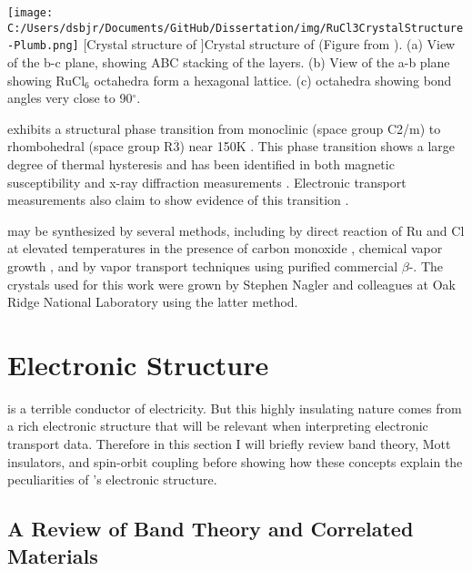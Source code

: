\begin{centering}
\texttt{[image: C:/Users/dsbjr/Documents/GitHub/Dissertation/img/RuCl3CrystalStructure-Plumb.png]}
  \captionsetup{width=0.75\textwidth}
  [Crystal structure of \ruclnospace]{Crystal structure of \rucl (Figure from \cite{Plumb2014}). (a) View of the b-c plane, showing ABC stacking of the layers. (b) View of the a-b plane showing RuCl$_{6}$ octahedra form a hexagonal lattice. (c) \rucl octahedra showing bond angles very close to 90$^{\circ}$.} 
  \label{fig:RuCl3CrystStruct-1}
\end{centering}

\rucl exhibits a structural phase transition from monoclinic (space group C2/m) to rhombohedral (space group R$\overline{3}$) near 150K \cite{Glamazda2017}. This phase transition shows a large degree of thermal hysteresis and has been identified in both magnetic susceptibility and x-ray diffraction measurements \cite{Park2016}. Electronic transport measurements also claim to show evidence of this transition \cite{Mashhadi2018}.

\rucl may be synthesized by several methods, including by direct reaction of Ru and Cl at elevated temperatures in the presence of carbon monoxide \cite{Binotto1971}, chemical vapor growth \cite{Gronke2018}, and by vapor transport techniques using purified commercial $\beta$-\ruclnospace \cite{Cao2016}. The \rucl crystals used for this work were grown by Stephen Nagler and colleagues at Oak Ridge National Laboratory using the latter method.

\section{Electronic Structure}

\rucl is a terrible conductor of electricity. But this highly insulating nature comes from a rich electronic structure that will be relevant when interpreting electronic transport data. Therefore in this section I will briefly review band theory, Mott insulators, and spin-orbit coupling before showing how these concepts explain the peculiarities of \rucl 's electronic structure.

\subsection{A Review of Band Theory and Correlated Materials}

